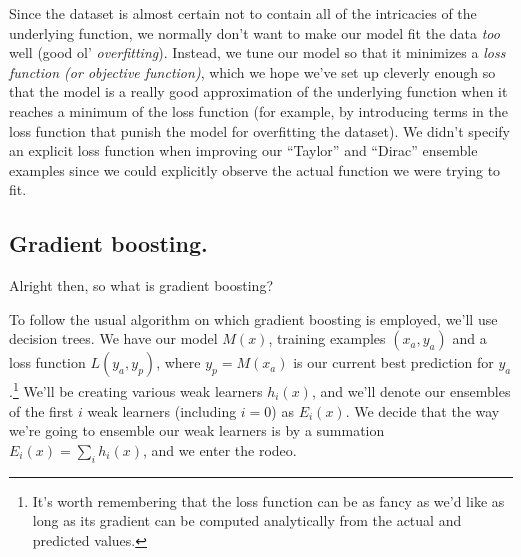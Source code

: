 \documentclass[letterpaper,12pt]{report}
\begin{document}
Since the dataset is almost certain not to contain all of the intricacies of the underlying
function, we normally don't want to make our model fit the data \emph{too} well
(good ol' \emph{overfitting}). Instead, we tune our model so that it
minimizes a
\emph{loss function (or objective function)}, 
which we hope we've set up cleverly enough so that
the model is a really good approximation of the underlying function when it reaches a minimum
of the loss function (for example, by introducing terms in the loss function that punish the
model for overfitting the dataset). We didn't specify an explicit loss function when
improving our ``Taylor'' and ``Dirac'' ensemble examples since we could explicitly observe the
actual function we were trying to fit.


\subsection{Gradient boosting.}\label{gradient-boosting}



Alright then, so what is gradient boosting? 

To follow the usual algorithm
on which gradient boosting is employed, we'll use decision trees.
We have our model \(M(x)\), training examples \((x_a, y_a)\) and a loss function
\(L(y_a, y_p)\), where \(y_p = M(x_a)\) is our current best prediction for \(y_a\).\footnote{
  It's worth
  remembering that the loss function can be as fancy as we'd like as long as its gradient
  can be computed analytically from the actual and predicted values.
}
We'll be creating various weak learners \(h_i(x)\), and we'll denote our ensembles of the first
\(i\) weak learners (including \(i=0\)) as \(E_i(x)\). We decide that the way we're going
to ensemble our weak learners is by a summation \(E_i(x) = \sum_{i} h_i(x)\),
and we enter the rodeo.
\end{document}
